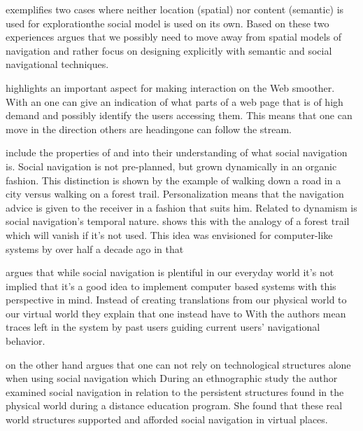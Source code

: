\citeauthor{dourish94} exemplifies two cases where neither location
(spatial) nor content (semantic) is used for exploration\dash{}the social
model is used on its own. Based on these two experiences
\citeauthor{dourish94} argues that we possibly need to move away from spatial
models of navigation and rather focus on designing explicitly with semantic
and social navigational techniques.

\citeauthor{dieberger97} highlights an important aspect for making interaction
on the Web smoother. With an
one can give an indication of what parts of a web page that is of high demand
and possibly identify the users accessing them. This means that one can move
in the direction others are heading\dash{}one can follow the stream.

\citet[]{dieberger00b} include the properties of 
and  into their understanding of what social navigation is.
Social navigation is not pre-planned, but grown dynamically in an organic
fashion. This distinction is shown by the example of walking down a road in a
city versus walking on a forest trail. Personalization means that the
navigation advice is given to the receiver in a fashion that suits him.
Related to dynamism is social navigation's temporal nature.
\citet[]{dieberger00b} shows this with the analogy of a forest trail
which will vanish if it's not used. This idea was envisioned for computer-like
systems by \citeauthor{bush45} over half a decade ago in that

\citet{svensson05} argues that while social navigation is plentiful in
our everyday world it's not implied that it's a good idea to implement
computer based systems with this perspective in mind. Instead of creating
translations from our physical world to our virtual world
they explain that one instead have to
With  the authors mean traces left in the system by past
users guiding current users' navigational behavior.

\citeauthor{robins02} on the other hand argues that one can not rely on
technological structures alone when using social navigation which
During an ethnographic study the author examined social navigation in relation
to the persistent structures found in the physical world during a distance
education program. She found that these real world structures supported and
afforded social navigation in virtual places.

